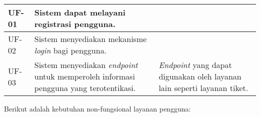 \begin{longtable}{|l|p{}|p{}|}
    \hline
    UF-01       & Sistem dapat melayani registrasi pengguna.                                                                                                                                                                                      &                                                                                                                                                                                                                                                                                                                                                       \\
    \hline
    UF-02       & Sistem menyediakan mekanisme \textit{login} bagi pengguna.                                                                                                                                                                      &                                                                                                                                                                                                                                                                                                                                                       \\
    \hline
    UF-03       & Sistem menyediakan \textit{endpoint} untuk memperoleh informasi pengguna yang terotentikasi.                                                                                                                  & \textit{Endpoint} yang dapat digunakan oleh layanan lain seperti layanan tiket.  \\
\end{longtable}
\endgroup

Berikut adalah kebutuhan non-fungsional layanan pengguna:

